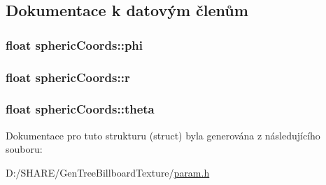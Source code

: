 \subsection{Dokumentace k datovým členům}
\hypertarget{structspheric_coords_ada3c00563debb0e2a958b29053c1129f}{
\subsubsection[{phi}]{\setlength{\rightskip}{0pt plus 5cm}float {\bf sphericCoords::phi}}}
\label{structspheric_coords_ada3c00563debb0e2a958b29053c1129f}
\hypertarget{structspheric_coords_a58420493f8d750185544a3333b174078}{
\subsubsection[{r}]{\setlength{\rightskip}{0pt plus 5cm}float {\bf sphericCoords::r}}}
\label{structspheric_coords_a58420493f8d750185544a3333b174078}
\hypertarget{structspheric_coords_a2e35aed643f9e07459bc9078858abc77}{
\subsubsection[{theta}]{\setlength{\rightskip}{0pt plus 5cm}float {\bf sphericCoords::theta}}}
\label{structspheric_coords_a2e35aed643f9e07459bc9078858abc77}


Dokumentace pro tuto strukturu (struct) byla generována z následujícího souboru:\begin{DoxyCompactItemize}
\item 
D:/SHARE/GenTreeBillboardTexture/\hyperlink{param_8h}{param.h}\end{DoxyCompactItemize}
